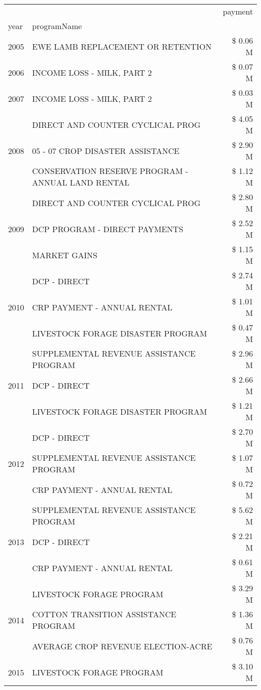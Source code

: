 \begin{tabular}{llr}
\toprule
 &  & payment \\
year & programName &  \\
\midrule
2005 & EWE LAMB REPLACEMENT OR RETENTION & \$ 0.06 M \\
\cline{1-3}
2006 & INCOME LOSS - MILK, PART 2 & \$ 0.07 M \\
\cline{1-3}
2007 & INCOME LOSS - MILK, PART 2 & \$ 0.03 M \\
\cline{1-3}
\multirow[t]{3}{*}{2008} & DIRECT AND COUNTER CYCLICAL PROG & \$ 4.05 M \\
 & 05 - 07 CROP DISASTER ASSISTANCE & \$ 2.90 M \\
 & CONSERVATION RESERVE PROGRAM - ANNUAL LAND RENTAL & \$ 1.12 M \\
\cline{1-3}
\multirow[t]{3}{*}{2009} & DIRECT AND COUNTER CYCLICAL PROG & \$ 2.80 M \\
 & DCP PROGRAM - DIRECT PAYMENTS & \$ 2.52 M \\
 & MARKET GAINS & \$ 1.15 M \\
\cline{1-3}
\multirow[t]{3}{*}{2010} & DCP - DIRECT & \$ 2.74 M \\
 & CRP PAYMENT - ANNUAL RENTAL & \$ 1.01 M \\
 & LIVESTOCK FORAGE DISASTER PROGRAM & \$ 0.47 M \\
\cline{1-3}
\multirow[t]{3}{*}{2011} & SUPPLEMENTAL REVENUE ASSISTANCE PROGRAM & \$ 2.96 M \\
 & DCP - DIRECT & \$ 2.66 M \\
 & LIVESTOCK FORAGE DISASTER PROGRAM & \$ 1.21 M \\
\cline{1-3}
\multirow[t]{3}{*}{2012} & DCP - DIRECT & \$ 2.70 M \\
 & SUPPLEMENTAL REVENUE ASSISTANCE PROGRAM & \$ 1.07 M \\
 & CRP PAYMENT - ANNUAL RENTAL & \$ 0.72 M \\
\cline{1-3}
\multirow[t]{3}{*}{2013} & SUPPLEMENTAL REVENUE ASSISTANCE PROGRAM & \$ 5.62 M \\
 & DCP - DIRECT & \$ 2.21 M \\
 & CRP PAYMENT - ANNUAL RENTAL & \$ 0.61 M \\
\cline{1-3}
\multirow[t]{3}{*}{2014} & LIVESTOCK FORAGE PROGRAM & \$ 3.29 M \\
 & COTTON TRANSITION ASSISTANCE PROGRAM & \$ 1.36 M \\
 & AVERAGE CROP REVENUE ELECTION-ACRE & \$ 0.76 M \\
\cline{1-3}
\multirow[t]{3}{*}{2015} & LIVESTOCK FORAGE PROGRAM & \$ 3.10 M \\

\end{tabular}

